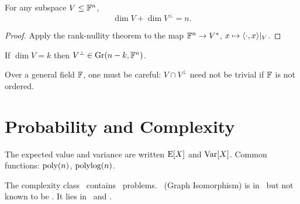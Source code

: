 \documentclass[12pt]{article}
\begin{document}
\begin{lemma}
    \label{lem:example}
    For any subspace $V \leq \mathbb{F}^{n}$,
    \[
        \dim V + \dim V^{\perp} = n.
    \]
\end{lemma}

\begin{proof}
    Apply the rank-nullity theorem to the map $\mathbb{F}^{n} \to V^{*}$, $x \mapsto \langle{\cdot}, {x}\rangle|_{V}$.
\end{proof}

\begin{corollary}
    If $\dim V = k$ then $V^{\perp} \in \mathrm{Gr}(n-k, \mathbb{F}^{n})$.
\end{corollary}

\begin{remark}
    Over a general field $\mathbb{F}$, one must be careful: $V \cap V^{\perp}$ need not be trivial
    if $\mathbb{F}$ is not ordered.
\end{remark}

\section{Probability and Complexity}

The expected value and variance are written $\mathrm{E}[X]$ and $\mathrm{Var}[X]$.
Common functions: $\text{poly}(n)$, $\text{polylog}(n)$.

The complexity class \NP\ contains \NPc\ problems.
\GI\ (Graph Isomorphism) is in \NP\ but not known to be \NPc.
It lies in \AM\ and \SZK.
\end{document}
